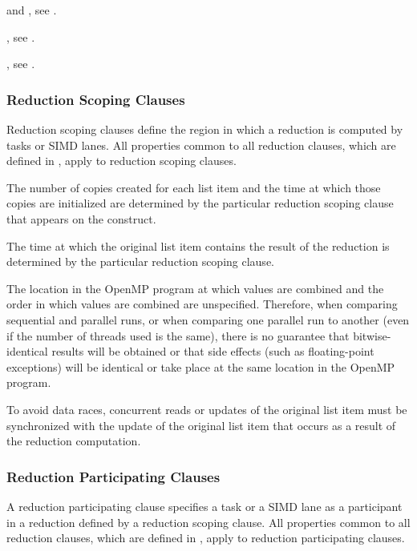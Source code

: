 \begin{crossrefs}
\item {} and , see
.

\item {}, see
.

\item {}, see
.

\end{crossrefs}



\subsubsection{Reduction Scoping Clauses}
\label{subsubsec:Reduction Scoping Clauses}
Reduction scoping clauses define the region in which a reduction is computed by
tasks or SIMD lanes. All properties common to all reduction clauses, which are 
defined in , apply 
to reduction scoping clauses.

The number of copies created for each list item and the time at which those
copies are initialized are determined by the particular reduction scoping clause
that appears on the construct.

The time at which the original list item contains the result of the reduction
is determined by the particular reduction scoping clause.

The location in the OpenMP program at which values are combined and the
order in which values are combined are unspecified. Therefore, when
comparing sequential and parallel runs, or when comparing one parallel run to
another (even if the number of threads used is the same), there is no guarantee
that bitwise-identical results will be obtained or that side effects (such as
floating-point exceptions) will be identical or take place at the same location
in the OpenMP program.

To avoid data races, concurrent reads or updates of the original list item
must be synchronized with the update of the original list item that occurs as a
result of the reduction computation.



\subsubsection{Reduction Participating Clauses}
\label{subsubsec:Reduction Participating Clauses}
A reduction participating clause specifies a task or a SIMD lane as a
participant in a reduction defined by a reduction scoping clause. All 
properties common to all reduction clauses, which are defined in 
, apply to
reduction participating clauses.

